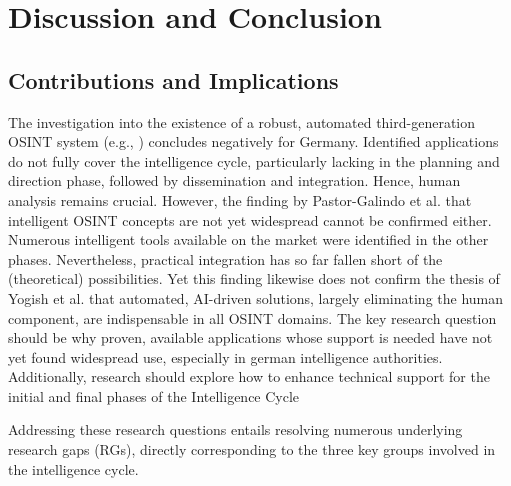 \documentclass[10pt]{article}
\begin{document}
\section{Discussion and Conclusion} \label{sec:discussion}
\subsection{Contributions and Implications}

The investigation into the existence of a robust, automated third-generation OSINT system (e.g., \cite{Ghioni.2023}) concludes negatively for Germany. Identified applications do not fully cover the intelligence cycle, particularly lacking in the planning and direction phase, followed by dissemination and integration. Hence, human analysis remains crucial. However, the finding by Pastor-Galindo et al. \cite{PastorGalindo.2020} that intelligent OSINT
concepts are not yet widespread cannot be confirmed either. Numerous intelligent tools available
on the market were identified in the other phases. Nevertheless, practical integration has so far
fallen short of the (theoretical) possibilities. Yet this finding likewise does not confirm the
thesis of Yogish et al. \cite{Yogish.2021} that automated, AI-driven solutions, largely eliminating
the human component, are indispensable in all OSINT domains. The key research
question should be why proven, available applications whose support is needed have not
yet found widespread use, especially in german intelligence authorities. Additionally, research should explore how to enhance technical support for the initial and final phases of the Intelligence Cycle

Addressing these research questions entails resolving numerous underlying research gaps (RGs), directly corresponding to the three key groups involved in the intelligence cycle.
\end{document}
